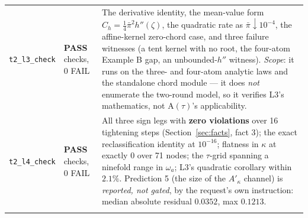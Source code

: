 \documentclass[11pt,a4paper]{article}
\newcommand{\Atau}{\mathrm{A}(\tau)}
\newcommand{\Akap}{A'_{\kappa}}
\begin{document}
\begin{longtable}{@{}>{\raggedright\arraybackslash}p{}>{\raggedright\arraybackslash}p{}>{\raggedright\arraybackslash}p{}@{}}
\texttt{t2\_l3\_check} & \textbf{PASS} \newline 10 checks, 0 FAIL &
The derivative identity, the mean-value form
$C_h=\tfrac14\bar\pi^2h''(\zeta)$, the quadratic rate as $\bar\pi\downarrow10^{-4}$,
the affine-kernel zero-chord case, and three failure witnesses (a tent kernel with no
root, the four-atom Example B gap, an unbounded-$h''$ witness). \emph{Scope}: it runs
on the three- and four-atom analytic laws and the standalone chord module --- it does
\emph{not} enumerate the two-round model, so it verifies L3's mathematics, not
$\Atau$'s applicability. \\
\addlinespace

\texttt{t2\_l4\_check} & \textbf{PASS} \newline 10 checks, 0 FAIL &
All three sign legs with \textbf{zero violations} over 16 tightening steps
(Section~\ref{sec:facts}, fact 3); the exact reclassification identity at $10^{-16}$; flatness in $\kappa$ at
exactly $0$ over 71 nodes; the $\tau$-grid spanning a ninefold range in $\omega_a$;
L3's quadratic corollary within $2.1\%$. Prediction 5 (the size of the $\Akap$
channel) is \emph{reported, not gated}, by the request's own instruction: median
absolute residual $0.0352$, max $0.1213$. \\
\addlinespace


\end{longtable}
\end{document}
